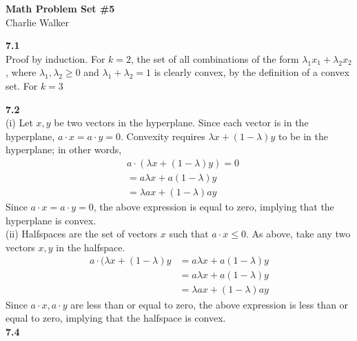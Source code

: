 \documentclass[letterpaper,12pt]{article}
\theoremstyle{definition}
\begin{document}
\begin{flushleft}
  \textbf{\large{Math Problem Set \#5}} \\
  Charlie Walker
\end{flushleft}

\vspace{5mm}

\noindent\textbf{7.1}\\
Proof by induction. For $k=2$, the set of all combinations of the form $\lambda_1x_1 + \lambda_2x_2$, where $\lambda_1, \lambda_2 \geq 0$ and $\lambda_1 + \lambda_2 = 1$ is clearly convex, by the definition of a convex set. For $k=3$

\noindent\textbf{7.2}\\
(i) Let $x, y$ be two vectors in the hyperplane. Since each vector is in the hyperplane, $a \cdot x = a \cdot y = 0$. Convexity requires $\lambda x + (1 - \lambda) y$ to be in the hyperplane; in other words,
\begin{align*}
&a \cdot (\lambda x + (1 - \lambda) y) = 0\\
&= a \lambda x + a(1-\lambda)y\\
&= \lambda ax + (1 - \lambda) ay
\end{align*}
Since $a \cdot x = a \cdot y = 0$, the above expression is equal to zero, implying that the hyperplane is convex.\\

\noindent (ii) Halfspaces are the set of vectors $x$ such that $a \cdot x \leq 0$. As above, take any two vectors $x, y$ in the halfspace. 
\begin{align*}
a \cdot (\lambda x + (1-\lambda)y &= a\lambda x + a(1-\lambda)y\\
&= a \lambda x + a(1-\lambda) y\\
&= \lambda ax + (1-\lambda)ay
\end{align*}
Since $a \cdot x, a\cdot y$ are less than or equal to zero, the above expression is less than or equal to zero, implying that the halfspace is convex.\\

\noindent\textbf{7.4}\\
\end{document}

